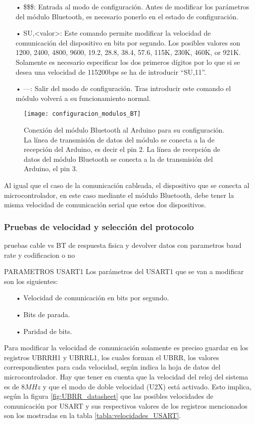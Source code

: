 \begin{itemize}
\item[•] \$\$\$: Entrada al modo de configuración. Antes de modificar los parámetros del módulo Bluetooth, es necesario ponerlo en el estado de configuración. 
\item[•] SU,<valor>: Este comando permite modificar la velocidad de comunicación del dispositivo en bits por segundo. Los posibles valores son 1200, 2400, 4800, 9600, 19.2, 28.8, 38.4, 57.6, 115K, 230K, 460K, or 921K. Solamente es necesario especificar los dos primeros dígitos por lo que si se desea una velocidad de 115200bps se ha de introducir ``SU,11''.
\item[•] ---: Salir del modo de configuración. Tras introducir este comando el módulo volverá a su funcionamiento normal.
\end{itemize}

\begin{figure}[!htb]
\centering
\texttt{[image: configuracion\_modulos\_BT]}
  \caption{Conexión del módulo Bluetooth al Arduino para su configuración. La línea de transmisión de datos del módulo se conecta a la de recepción del Arduino, es decir el pin 2. La línea de recepción de datos del módulo Bluetooth se conecta a la de transmisión del Arduino, el pin 3.}\label{fig:configuracion_modulos_BT}
\end{figure}

Al igual que el caso de la comunicación cableada, el dispositivo que se conecta al microcontrolador, en este caso mediante el módulo Bluetooth, debe tener la misma velocidad de comunicación serial que estos dos dispositivos.


\subsubsection{Pruebas de velocidad y selección del protocolo}
pruebas cable vs BT de respuesta fisica y devolver datos con parametros baud rate y codificacion o no

PARAMETROS USART1
Los parámetros del USART1 que se van a modificar son los siguientes:

\begin{itemize}
\item[•] Velocidad de comunicación en bits por segundo.
\item[•] Bits de parada.
\item[•] Paridad de bits.
\end{itemize}

Para modificar la velocidad de comunicación solamente es preciso guardar en los registros UBRRH1 y UBRRL1, los cuales forman el UBRR, los valores correspondientes para cada velocidad, según indica la hoja de datos del microcontrolador. Hay que tener en cuenta que la velocidad del reloj del sistema es de $8MHz$ y que el modo de doble velocidad (U2X) está activado. Esto implica, según la figura \ref{fig:UBRR_datasheet} que las posibles velocidades de comunicación por USART y sus respectivos valores de los registros mencionados son los mostradas en la tabla \ref{tabla:velocidades_USART}.\\


